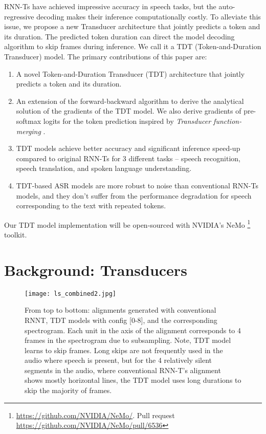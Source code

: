 \documentclass{article}
\begin{document}
RNN-Ts have achieved impressive accuracy in speech tasks, but
the auto-regressive decoding makes their inference computationally costly. To alleviate this issue, we propose a new Transducer architecture that jointly predicts  a token and its duration. The predicted token duration 
can direct the model decoding algorithm to skip frames during inference.  We call it a TDT (Token-and-Duration Transducer) model.
The primary contributions of this paper are:
\begin{enumerate}
    \item A novel Token-and-Duration Transducer (TDT) architecture that jointly predicts a token and its duration.
    \item An  extension of the forward-backward algorithm  to derive the analytical solution of
the gradients of the TDT model. We also derive gradients of pre-softmax logits for the token prediction inspired by \emph{Transducer function-merging} \cite{li2019improving}. 
    \item TDT models achieve better accuracy and significant inference speed-up compared to original RNN-Ts for 3 different tasks -- speech recognition, speech translation,  and spoken language understanding.
    \item TDT-based ASR  models are more robust to noise than conventional RNN-Ts models, and  they don't suffer from the performance degradation for speech corresponding to the text with repeated tokens.
\end{enumerate}
Our TDT model implementation will be open-sourced with NVIDIA's NeMo \footnote{\url{https://github.com/NVIDIA/NeMo/}. Pull request \url{https://github.com/NVIDIA/NeMo/pull/6536}} toolkit.




\section{Background: Transducers} \label{background}







\begin{figure}
    \centering
    \texttt{[image: ls\_combined2.jpg]}
    \caption{From top to bottom: alignments generated with conventional RNNT, TDT models with config  [0-8], and the corresponding spectrogram. Each unit in the  axis of the alignment corresponds to 4 frames in the spectrogram due to subsampling. Note, TDT model learns to skip frames. Long skips are not frequently used in the audio where speech is present, but for the 4 relatively silent segments in the audio, where conventional RNN-T's alignment shows mostly horizontal lines, the TDT model uses long durations to skip the majority of frames. }
    \label{first_figure}
\end{figure}
\end{document}
